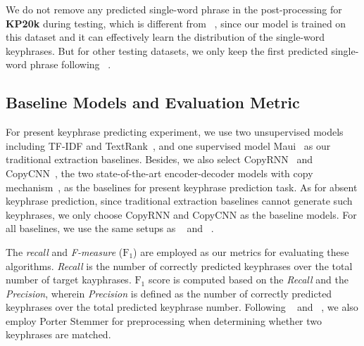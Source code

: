 \documentclass[letterpaper]{article} %
\begin{document}
We do not remove any predicted single-word phrase in the post-processing for \textbf{KP20k} during testing, which is different from \citeauthor{meng2017dkg}~, since our model is trained on this dataset and it can effectively learn the distribution of the single-word keyphrases. But for other testing datasets, we only keep the first predicted single-word phrase following \citeauthor{meng2017dkg}~.


\subsection{Baseline Models and Evaluation Metric}
For present keyphrase predicting experiment, we use two unsupervised models including TF-IDF and TextRank~\cite{mihalcea2004textrank}, and one supervised model Maui~\cite{medelyan2009human} as our traditional extraction baselines.
Besides, we also select CopyRNN~\cite{meng2017dkg} and CopyCNN~\cite{zhang2017dkg_conv}, the two state-of-the-art encoder-decoder models with copy mechanism~\cite{gu2016incorporating_copy}, as the baselines for present keyphrase prediction task. As for absent keyphrase prediction, since traditional extraction baselines cannot generate such keyphrases, we only choose CopyRNN and CopyCNN as the baseline models. For all baselines, we use the same setups as \citeauthor{meng2017dkg}~ and  \citeauthor{zhang2017dkg_conv}~.
% 

The \textit{recall} and \textit{F-measure} ($\text{F}_1$) are employed as our metrics for evaluating these algorithms. \textit{Recall} is the number of correctly predicted keyphrases over the total number of target kayphrases. $\text{F}_1$ score is computed based on the \textit{Recall} and  the \textit{Precision}, wherein \textit{Precision} is defined as the number of correctly predicted keyphrases over the total predicted keyphrase number. Following \citeauthor{meng2017dkg}~ and \citeauthor{zhang2017dkg_conv}~, we also employ Porter Stemmer for preprocessing when determining whether two keyphrases are matched.
\end{document}
